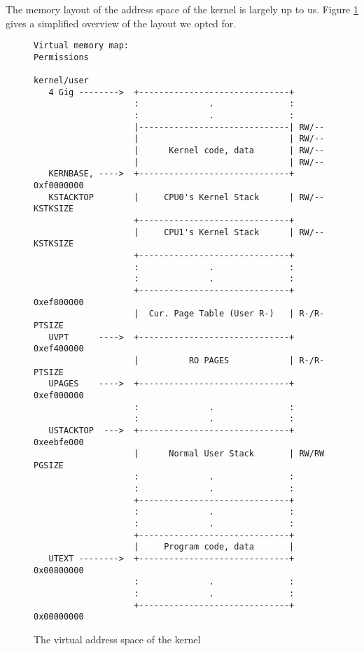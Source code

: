 \documentclass{article}
\begin{document}
The memory layout of the address space of the kernel is largely up to us.
Figure \ref{memlayout} gives a simplified overview of the layout we opted for.
\begin{figure}
    \centering
\begin{Verbatim}[fontsize=\small]
Virtual memory map:                                  Permissions
                                                     kernel/user
   4 Gig -------->  +------------------------------+
                    :              .               :
                    :              .               :
                    |------------------------------| RW/--
                    |                              | RW/--
                    |      Kernel code, data       | RW/--
                    |                              | RW/--
   KERNBASE, ---->  +------------------------------+ 0xf0000000      
   KSTACKTOP        |     CPU0's Kernel Stack      | RW/--  KSTKSIZE 
                    +------------------------------+                 
                    |     CPU1's Kernel Stack      | RW/--  KSTKSIZE 
                    +------------------------------+                 
                    :              .               :                 
                    :              .               :                 
                    +------------------------------+ 0xef800000
                    |  Cur. Page Table (User R-)   | R-/R-  PTSIZE
   UVPT      ---->  +------------------------------+ 0xef400000
                    |          RO PAGES            | R-/R-  PTSIZE
   UPAGES    ---->  +------------------------------+ 0xef000000
                    :              .               :                 
                    :              .               :                 
   USTACKTOP  --->  +------------------------------+ 0xeebfe000
                    |      Normal User Stack       | RW/RW  PGSIZE
                    :              .               :                 
                    :              .               :                 
                    +------------------------------+
                    :              .               :
                    :              .               :
                    +------------------------------+
                    |     Program code, data       |
   UTEXT -------->  +------------------------------+ 0x00800000
                    :              .               :                 
                    :              .               :                 
                    +------------------------------+ 0x00000000
\end{Verbatim}
    \caption{The virtual address space of the kernel}
    \label{memlayout}
\end{figure}
\end{document}
